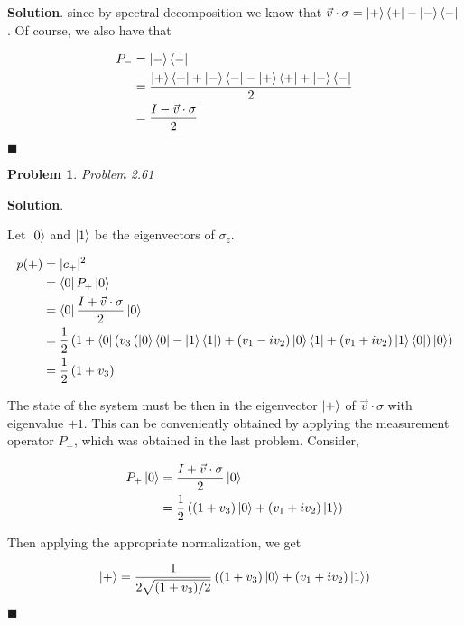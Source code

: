 \documentclass[12pt]{article}
\newtheorem{p}{Problem}
\theoremstyle{definition}
\newenvironment{s}{%
        \begin{trivlist} \item \textbf{Solution}. }{%
            \hspace*{\fill} $\blacksquare$\end{trivlist}}%
\begin{document}
{\begin{s}
since by spectral decomposition we know that  $\vec{v}\cdot\sigma = \ket{+}\bra{+} - \ket{-}\bra{-}$. Of course, we also have that 

\begin{align*}
P_{-} &= \ket{-}\bra{-}\\
&=\frac{\ket{+}\bra{+} + \ket{-}\bra{-} - \ket{+}\bra{+} + \ket{-}\bra{-}}{2}\\ 
&= \frac{I-\vec{v}\cdot\sigma}{2}
\end{align*}



\end{s}
\begin{p}
Problem 2.61
\end{p}

\begin{s}

Let $\ket{0}$ and $\ket{1}$ be the eigenvectors of $\sigma_{z}$.

\begin{align*}
p(+) &= |c_{+}|^{2}\\
&= \bra{0} P_{+}\ket{0}\\
&= \bra{0} \frac{I + \vec{v}\cdot\sigma}{2}\ket{0}\\
&= \frac{1}{2}\left(1 + \bra{0}\left(v_{3}\left(\ket{0}\bra{0} - \ket{1}\bra{1}\right) + \left(v_{1}-iv_{2}\right)\ket{0}\bra{1} + \left(v_{1}+iv_{2}\right)\ket{1}\bra{0}\right)\ket{0}\right)\\
&= \frac{1}{2}\left(1 + v_{3}\right)
\end{align*}

The state of the system must be then in the eigenvector $\ket{+}$ of $\vec{v}\cdot\sigma$ with eigenvalue $+1$. This can be conveniently obtained by applying the measurement operator $P_{+}$, which was obtained in the last problem. Consider,


\begin{align*} 
P_{+}\ket{0} &= \frac{I+\vec{v}\cdot\sigma}{2}\ket{0}\\
&= \frac{1}{2}\left((1+v_{3})\ket{0} + (v_{1} + iv_{2})\ket{1}\right)
\end{align*}

Then applying the appropriate normalization, we get

\begin{align*} 
\ket{+} =  \frac{1}{2\sqrt{(1+v_{3})/2}}\left((1+v_{3})\ket{0} + (v_{1} + iv_{2})\ket{1}\right)
\end{align*}

\end{s}
\end{document}

